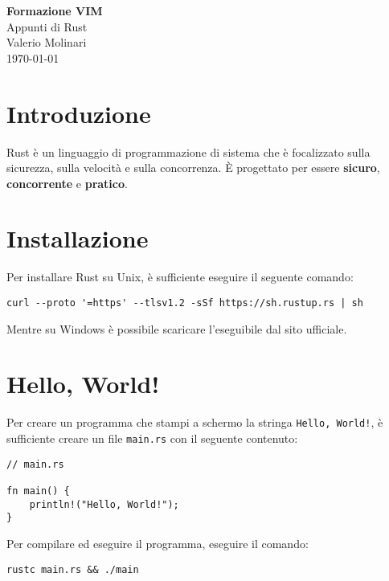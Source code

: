 \documentclass[12pt]{article}
\newcommand{\important}[1]{\textcolor{accent}{\textbf{#1}}}
\begin{document}
\begin{titlepage}
\begin{center}
\vspace*{3cm}
\Huge\textcolor{primary}{\textbf{Formazione VIM}} \\[1cm]
\Large\textcolor{secondary}{Appunti di Rust} \\[1cm]
\textcolor{accent}{Valerio Molinari}\\
\vfill
\today
\end{center}
\end{titlepage}

\tableofcontents
\newpage

\section{Introduzione}
Rust è un linguaggio di programmazione di sistema che è focalizzato 
sulla sicurezza, sulla velocità e sulla concorrenza. 
È progettato per essere \important{sicuro}, \important{concorrente} e 
\important{pratico}.

\section{Installazione}
Per installare Rust su Unix, è sufficiente eseguire il seguente comando:
\begin{verbatim}
curl --proto '=https' --tlsv1.2 -sSf https://sh.rustup.rs | sh
\end{verbatim}
Mentre su Windows è possibile scaricare l'eseguibile dal sito ufficiale.

\section{Hello, World!}
Per creare un programma che stampi a schermo la stringa \texttt{Hello, World!},
è sufficiente creare un file \texttt{main.rs} con il seguente contenuto:
\begin{verbatim}
// main.rs

fn main() {
    println!("Hello, World!");
}
\end{verbatim}
Per compilare ed eseguire il programma, eseguire il comando:
\begin{verbatim}
rustc main.rs && ./main
\end{verbatim}
\end{document}
